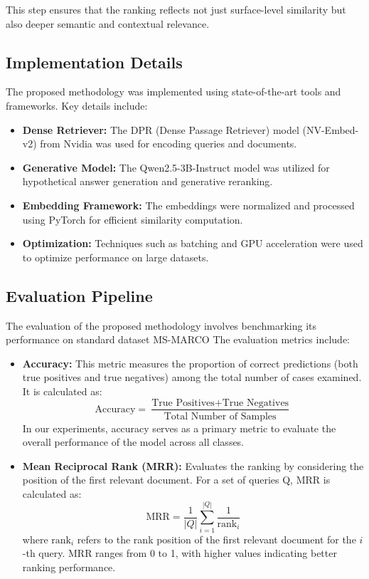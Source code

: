 This step ensures that the ranking reflects not just surface-level similarity but also deeper semantic and contextual relevance.

\subsection{Implementation Details}
The proposed methodology was implemented using state-of-the-art tools and frameworks. Key details include:
\begin{itemize}
    \item \textbf{Dense Retriever:} The DPR (Dense Passage Retriever) model (NV-Embed-v2)\cite{nvembed} from Nvidia was used for encoding queries and documents.
    \item \textbf{Generative Model:} The Qwen2.5-3B-Instruct\cite{qwen2.5} model was utilized for hypothetical answer generation and generative reranking.
    \item \textbf{Embedding Framework:} The embeddings were normalized and processed using PyTorch\cite{pytorch} for efficient similarity computation.
    \item \textbf{Optimization:} Techniques such as batching and GPU acceleration were used to optimize performance on large datasets.
\end{itemize}

\subsection{Evaluation Pipeline}
The evaluation of the proposed methodology involves benchmarking its performance on standard dataset MS-MARCO\cite{ms-marco} The evaluation metrics include:
\begin{itemize}
       \item \textbf{Accuracy:} This metric measures the proportion of correct predictions (both true positives and true negatives) among the total number of cases examined. It is calculated as:
    \begin{equation}
        \text{Accuracy} = \frac{\text{True Positives} + \text{True Negatives}}{\text{Total Number of Samples}}
    \end{equation}
    In our experiments, accuracy serves as a primary metric to evaluate the overall performance of the model across all classes.
        \item \textbf{Mean Reciprocal Rank (MRR):} Evaluates the ranking by considering the position of the first relevant document. For a set of queries Q, MRR is calculated as:
    \begin{equation}
        \text{MRR} = \frac{1}{|Q|} \sum_{i=1}^{|Q|} \frac{1}{\text{rank}_i}
    \end{equation}
    where $\text{rank}_i$ refers to the rank position of the first relevant document for the $i$-th query. MRR ranges from 0 to 1, with higher values indicating better ranking performance.
\end{itemize}

